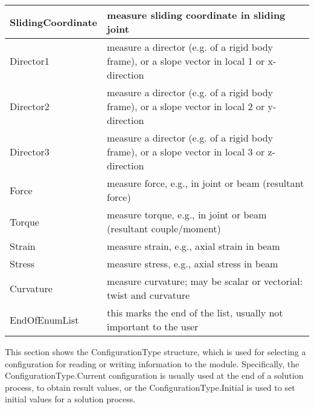 \begin{center}
\begin{longtable}{| p{8cm} | p{8cm} |}
  SlidingCoordinate & measure sliding coordinate in sliding joint\\ \hline 
  Director1 & measure a director (e.g. of a rigid body frame), or a slope vector in local 1 or x-direction\\ \hline 
  Director2 & measure a director (e.g. of a rigid body frame), or a slope vector in local 2 or y-direction\\ \hline 
  Director3 & measure a director (e.g. of a rigid body frame), or a slope vector in local 3 or z-direction\\ \hline 
  Force & measure force, e.g., in joint or beam (resultant force)\\ \hline 
  Torque & measure torque, e.g., in joint or beam (resultant couple/moment)\\ \hline 
  Strain & measure strain, e.g., axial strain in beam\\ \hline 
  Stress & measure stress, e.g., axial stress in beam\\ \hline 
  Curvature & measure curvature; may be scalar or vectorial: twist and curvature\\ \hline 
  EndOfEnumList & this marks the end of the list, usually not important to the user\\ \hline 
\end{longtable}
\end{center}

This section shows the ConfigurationType structure, which is used for selecting a configuration for reading or writing information to the module. Specifically, the ConfigurationType.Current configuration is usually used at the end of a solution process, to obtain result values, or the ConfigurationType.Initial is used to set initial values for a solution process.



